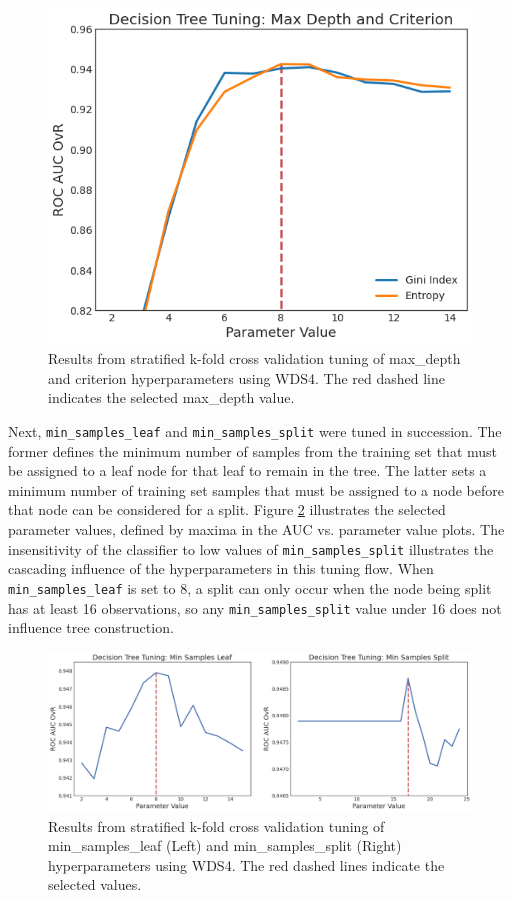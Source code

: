 \begin{figure}[!htp]
\centering
\includegraphics[width=.6\textwidth]{templates/images/Figure-DT_tuning_maxdepth_criterion.png}
\caption[Decision tree max depth tuning]{Results from stratified k-fold cross validation tuning of max\_depth and criterion hyperparameters using WDS4. The red dashed line indicates the selected max\_depth value.}
\label{fig:dtree_maxdepth}
\end{figure}

Next, \verb|min_samples_leaf| and \verb|min_samples_split| were tuned in succession. The former defines the minimum number of samples from the training set that must be assigned to a leaf node for that leaf to remain in the tree. The latter sets a minimum number of training set samples that must be assigned to a node before that node can be considered for a split. Figure \ref{fig:dtree_min_samples} illustrates the selected parameter values, defined by maxima in the AUC vs. parameter value plots. The insensitivity of the classifier to low values of \verb|min_samples_split| illustrates the cascading influence of the hyperparameters in this tuning flow. When \verb|min_samples_leaf| is set to 8, a split can only occur when the node being split has at least 16 observations, so any \verb|min_samples_split| value under 16 does not influence tree construction. 

\begin{figure}[!htp]
\centering
\includegraphics[width=\textwidth]{templates/images/Figure-DT_tuning_min_samp_leaf_split.png}
\caption[Decision tree min samples tuning]{Results from stratified k-fold cross validation tuning of min\_samples\_leaf (Left) and min\_samples\_split (Right) hyperparameters using WDS4. The red dashed lines indicate the selected values.}
\label{fig:dtree_min_samples}
\end{figure}

